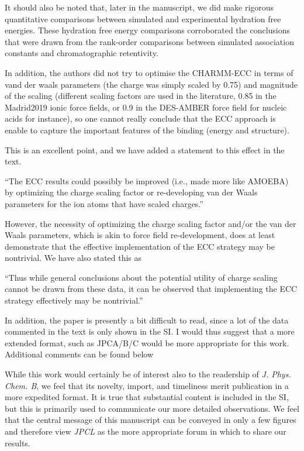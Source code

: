 \documentclass[answers,12pt]{exam}
\begin{document}
\begin{questions}
\begin{solution}
    It should also be noted that, later in the manuscript, we did make rigorous quantitative comparisons between simulated and experimental hydration free energies. These hydration free energy comparisons corroborated the conclusions that were drawn from the rank-order comparisons between simulated association constants and chromatographic retentivity.
    
    \end{solution}
    
    \question In addition, the authors did not try to optimise the CHARMM-ECC in terms of vand der waals parameters (the charge was simply scaled by 0.75) and magnitude of the scaling (different scaling factors are used in the literature, 0.85 in the Madrid2019 ionic force fields, or 0.9 in the DES-AMBER force field for nucleic acids for instance), so one cannot really conclude that the ECC approach is enable to capture the important features of the binding (energy and structure).
    \begin{solution}
    This is an excellent point, and we have added a statement to this effect in the text. 

    ``The ECC results could possibly be improved (i.e., made more like AMOEBA) by optimizing the charge scaling factor or re-developing van der Waals parameters for the ion atoms that have scaled charges.''
    
    However, the necessity of optimizing the charge scaling factor and/or the van der Waals parameters, which is akin to force field re-development, does at least demonstrate that the effective implementation of the ECC strategy may be nontrivial. We have also stated this as

    ``Thus while general conclusions about the potential utility of charge scaling cannot be drawn from these data, it can be observed that implementing the ECC strategy effectively may be nontrivial.''
    
    \end{solution}
 
    \question In addition, the paper is presently a bit difficult to read, since a lot of the data commented in the text is only shown in the SI. I would thus suggest that a more extended format, such as JPCA/B/C would be more appropriate for this work. Additional comments can be found below
    \begin{solution}
    While this work would certainly be of interest also to the readership of \textit{J. Phys. Chem. B}, we feel that its novelty, import, and timeliness merit publication in a more expedited format. It is true that substantial content is included in the SI, but this is primarily used to communicate our more detailed observations. We feel that the central message of this manuscript can be conveyed in only a few figures and therefore view \emph{JPCL} as the more appropriate forum in which to share our results. 
    \end{solution}
 

\end{questions}
\end{document}
